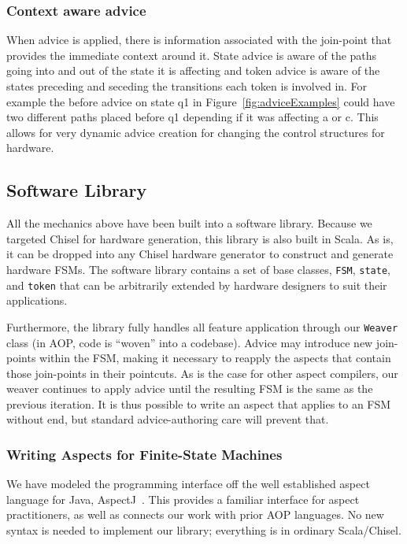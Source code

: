 \documentclass[conference]{IEEEtran}
\begin{document}
\subsubsection{Context aware advice}  When advice is applied, there is information associated with the join-point that provides
 the immediate context around it. State advice is aware of the paths going into and out of the state it is affecting and token advice is aware of the states preceding and seceding the transitions each token is involved in. For example the before advice on state q1 in Figure~\ref{fig:adviceExamples} could have two different paths placed before q1 depending if it was affecting a or c. This allows for very dynamic advice creation for changing the control structures for hardware.

\subsection{Software Library}\label{sec:foam}
All the mechanics above have been built into a software library. Because we targeted Chisel for hardware generation, this library is also built in Scala. As is, it can be dropped into any Chisel hardware generator to construct and generate hardware FSMs. The software library contains a set of base classes, \texttt{FSM}, \texttt{state}, and \texttt{token} that can be arbitrarily extended by hardware designers to suit their applications. 

Furthermore, the library fully handles all feature application through our \texttt{Weaver} class (in AOP, code is ``woven'' into a codebase). Advice may introduce new join-points within the FSM, making it necessary to reapply the aspects that contain those join-points in their pointcuts. As is the case for other aspect compilers, our weaver continues to apply advice until the resulting FSM is the same as the previous iteration.  It is thus possible to write an aspect that applies to an FSM without end, but standard advice-authoring care will prevent that.

\subsubsection{Writing Aspects for Finite-State Machines}
We have modeled the programming interface off the well established aspect language for Java, AspectJ~\cite{AspectJ:01}. This provides a familiar interface for aspect practitioners, as well as connects our work with prior AOP languages. No new syntax is needed to implement our library; everything is in ordinary Scala/Chisel.
\end{document}
